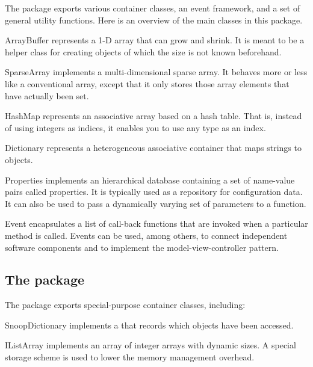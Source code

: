 \documentclass[a4paper,10pt]{article}
\begin{document}
The  package exports various container classes, an event
framework, and a set of general utility functions. Here is an overview of
the main classes in this package.
\begin{Description}[\Code]

\item[ArrayBuffer] represents a 1-D array that can grow and shrink. It is
  meant to be a helper class for creating  objects of which
  the size is not known beforehand.

\item[SparseArray] implements a multi-dimensional sparse array. It
  behaves more or less like a conventional array, except that it only
  stores those array elements that have actually been set.

\item[HashMap] represents an associative array based on a hash table.
  That is, instead of using integers as indices, it enables you to use
  any type as an index.

\item[Dictionary] \label{class:Dictionary} represents a heterogeneous
  associative container that maps strings to objects.

\item[Properties] \label{class:Properties} implements an hierarchical
  database containing a set of name-value pairs called properties. It is
  typically used as a repository for configuration data. It can also be
  used to pass a dynamically varying set of parameters to a function.

\item[Event] \label{class:Event} encapsulates a list of call-back
  functions that are invoked when a particular method is called. Events
  can be used, among others, to connect independent software components
  and to implement the model-view-controller pattern.

\end{Description}

\subsection{The  package}

The  package exports special-purpose container classes,
including:
\begin{Description}[\Code]

\item[SnoopDictionary] implements a
  \hyperref[class:Dictionary]{} that records which
  objects have been accessed.

\item[IListArray] implements an array of integer arrays with dynamic
  sizes. A special storage scheme is used to lower the memory management
  overhead.

\end{Description}
\end{document}
